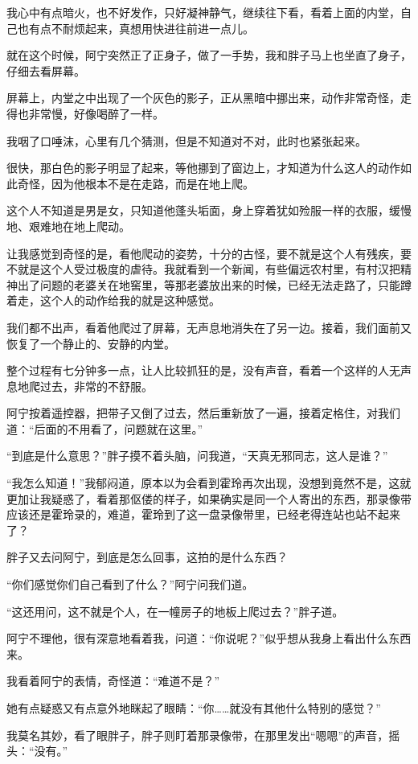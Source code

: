我心中有点暗火，也不好发作，只好凝神静气，继续往下看，看着上面的内堂，自己也有点不耐烦起来，真想用快进往前进一点儿。

就在这个时候，阿宁突然正了正身子，做了一手势，我和胖子马上也坐直了身子，仔细去看屏幕。

屏幕上，内堂之中出现了一个灰色的影子，正从黑暗中挪出来，动作非常奇怪，走得也非常慢，好像喝醉了一样。

我咽了口唾沫，心里有几个猜测，但是不知道对不对，此时也紧张起来。

很快，那白色的影子明显了起来，等他挪到了窗边上，才知道为什么这人的动作如此奇怪，因为他根本不是在走路，而是在地上爬。

这个人不知道是男是女，只知道他蓬头垢面，身上穿着犹如殓服一样的衣服，缓慢地、艰难地在地上爬动。

让我感觉到奇怪的是，看他爬动的姿势，十分的古怪，要不就是这个人有残疾，要不就是这个人受过极度的虐待。我就看到一个新闻，有些偏远农村里，有村汉把精神出了问题的老婆关在地窖里，等那老婆放出来的时候，已经无法走路了，只能蹲着走，这个人的动作给我的就是这种感觉。

我们都不出声，看着他爬过了屏幕，无声息地消失在了另一边。接着，我们面前又恢复了一个静止的、安静的内堂。

整个过程有七分钟多一点，让人比较抓狂的是，没有声音，看着一个这样的人无声息地爬过去，非常的不舒服。

阿宁按着遥控器，把带子又倒了过去，然后重新放了一遍，接着定格住，对我们道：“后面的不用看了，问题就在这里。”

“到底是什么意思？”胖子摸不着头脑，问我道，“天真无邪同志，这人是谁？”

“我怎么知道！”我郁闷道，原本以为会看到霍玲再次出现，没想到竟然不是，这就更加让我疑惑了，看着那伛偻的样子，如果确实是同一个人寄出的东西，那录像带应该还是霍玲录的，难道，霍玲到了这一盘录像带里，已经老得连站也站不起来了？

胖子又去问阿宁，到底是怎么回事，这拍的是什么东西？

“你们感觉你们自己看到了什么？”阿宁问我们道。

“这还用问，这不就是个人，在一幢房子的地板上爬过去？”胖子道。

阿宁不理他，很有深意地看着我，问道：“你说呢？”似乎想从我身上看出什么东西来。

我看着阿宁的表情，奇怪道：“难道不是？”

她有点疑惑又有点意外地眯起了眼睛：“你……就没有其他什么特别的感觉？”

我莫名其妙，看了眼胖子，胖子则盯着那录像带，在那里发出“嗯嗯”的声音，摇头：“没有。”

